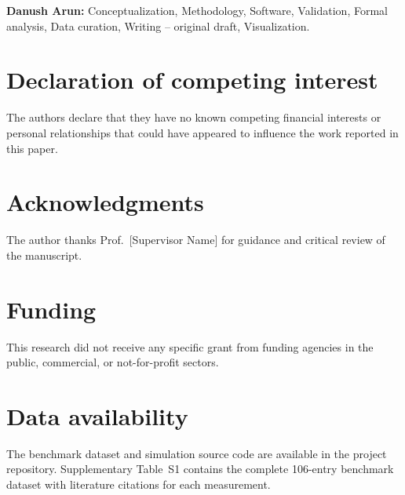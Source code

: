 \documentclass[review,3p,authoryear]{elsarticle}
\begin{document}
\textbf{Danush Arun:} Conceptualization, Methodology, Software, Validation, Formal analysis, Data curation, Writing -- original draft, Visualization.

\section*{Declaration of competing interest}

The authors declare that they have no known competing financial interests or personal relationships that could have appeared to influence the work reported in this paper.

\section*{Acknowledgments}

The author thanks Prof.\ [Supervisor Name] for guidance and critical review of the manuscript.

\section*{Funding}

This research did not receive any specific grant from funding agencies in the public, commercial, or not-for-profit sectors.

\section*{Data availability}

The benchmark dataset and simulation source code are available in the project repository. Supplementary Table~S1 contains the complete 106-entry benchmark dataset with literature citations for each measurement.

\end{document}
